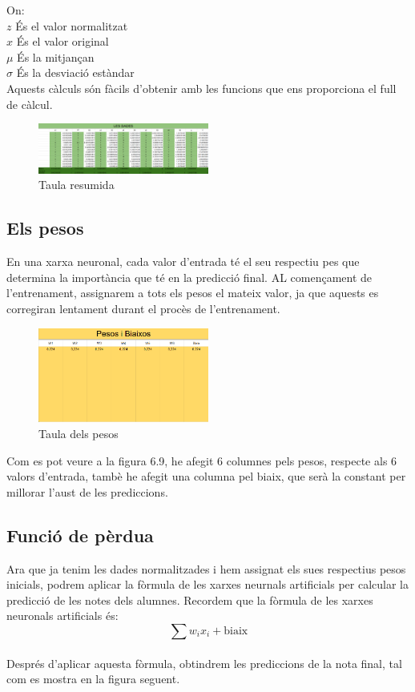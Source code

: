 On:\\
$z$ És el valor normalitzat\\
$x$ És el valor original\\
$\mu$ És la mitjançan\\
$\sigma$ És la desviació estàndar\\

Aquests càlculs són fàcils d'obtenir amb les funcions que ens proporciona el full de càlcul.

\begin{figure}[H]
    \centering
    \includegraphics[width=0.5\textwidth]{./figures/Dades_normalitzades.png}
    \caption{Taula resumida}
\end{figure}

\subsection{Els pesos}
En una xarxa neuronal, cada valor d'entrada té el seu respectiu pes que determina la importància que té en la predicció final. AL començament de l'entrenament, assignarem a tots els pesos el mateix valor, ja que aquests es corregiran lentament durant el procès de l'entrenament.

\begin{figure}[H]
    \centering
    \includegraphics[width=0.5\textwidth]{./figures/Pesos.png}
    \caption{Taula dels pesos}
\end{figure}

Com es pot veure a la figura 6.9, he afegit 6 columnes pels pesos, respecte als 6 valors d'entrada, tambè he afegit una columna pel biaix, que serà la constant per millorar l'aust de les prediccions.

\subsection{Funció de pèrdua}
Ara que ja tenim les dades normalitzades i hem assignat els sues respectius pesos inicials, podrem aplicar la fòrmula de les xarxes neurnals artificials per calcular la predicció de les notes dels alumnes.
Recordem que la fòrmula de les xarxes neuronals artificials és:\\
\[
\sum w_i x_i + \text{biaix}
\]\\
Després d'aplicar aquesta fòrmula, obtindrem les prediccions de la nota final, tal com es mostra en la figura seguent.

